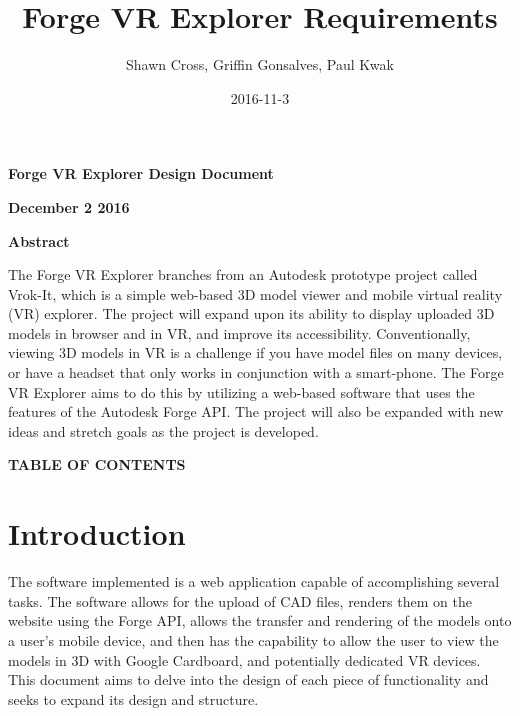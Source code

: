\documentclass[letterpaper, 10pt, draftclsnofoot, compsoc, onecolumn]{IEEEtran}
\title{Forge VR Explorer Requirements}
\author{Shawn Cross, Griffin Gonsalves, Paul Kwak}
\date{2016-11-3}
\begin{document}
\clearpage\setcounter{page}{1}\pagestyle{Standard}
\thispagestyle{FirstPage}

\bigskip

{\centering{}\bfseries\color{black}
Forge VR Explorer Design Document
\par}


\bigskip

{\centering{}\bfseries\color{black}
December 2 2016
\par}
\bigskip
\bigskip
\bigskip
\bigskip
\bigskip
\bigskip
\bigskip
\bigskip
\bigskip
\bigskip
\bigskip
\bigskip


\vfill
{\centering{}\bfseries\color{black}
Abstract
\par}

{\centering{}\mdseries\color{black}
	The Forge VR Explorer branches from an Autodesk prototype project called Vrok-It, which is a simple web-based 3D 
	model viewer and mobile virtual reality (VR) explorer. The project will expand upon its ability to display uploaded 3D 
	models in browser and in VR, and improve its accessibility. Conventionally, viewing 3D models in VR is a challenge if 
	you have model files on many devices, or have a headset that only works in conjunction with a smart-phone. The 
	Forge VR Explorer aims to do this by utilizing a web-based software that uses the features of the Autodesk Forge API. 
	The project will also be expanded with new ideas and stretch goals as the project is developed.
\par}
\clearpage
{\centering{}\bfseries\color{black}
TABLE OF CONTENTS
\par}

\bigskip

\setcounter{tocdepth}{2}
\renewcommand\contentsname{}
\tableofcontents

\bigskip
\clearpage


\section{Introduction}
The software implemented is a web application capable of accomplishing several tasks. The software allows for the upload of CAD files, renders them on the website using the Forge API, allows the transfer and rendering of the models onto a user's mobile device, and then has the capability to allow the user to view the models in 3D with Google Cardboard, and potentially dedicated VR devices. This document aims to delve into the design of each piece of functionality and seeks to expand its design and structure.
\end{document}
